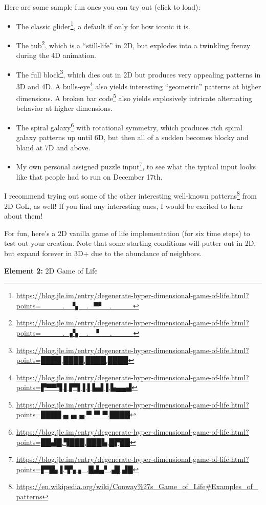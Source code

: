 \documentclass[]{article}
\renewcommand{\href}[2]{#2\footnote{\url{#1}}}
\begin{document}
Here are some sample fun ones you can try out (click to load):

\begin{itemize}
\tightlist
\item
  The
  \href{https://blog.jle.im/entry/degenerate-hyper-dimensional-game-of-life.html?points=____._▝▖_._▀▘_.____}{classic
  glider}, a default if only for how iconic it is.
\item
  The
  \href{https://blog.jle.im/entry/degenerate-hyper-dimensional-game-of-life.html?points=____._▞▖_._▝__.____}{tub},
  which is a ``still-life'' in 2D, but explodes into a twinkling frenzy during
  the 4D animation.
\item
  The
  \href{https://blog.jle.im/entry/degenerate-hyper-dimensional-game-of-life.html?points=████.████.████.████}{full
  block}, which dies out in 2D but produces very appealing patterns in 3D and
  4D. A
  \href{https://blog.jle.im/entry/degenerate-hyper-dimensional-game-of-life.html?points=▛▀▀▜.▌▛▜▐.▌▙▟▐.▙▄▄▟}{bulls-eye}
  also yields interesting ``geometric'' patterns at higher dimensions. A
  \href{https://blog.jle.im/entry/degenerate-hyper-dimensional-game-of-life.html?points=████.▄▗▖▄.▀▝▘▀.████}{broken
  bar code} also yields explosively intricate alternating behavior at higher
  dimensions.
\item
  The
  \href{https://blog.jle.im/entry/degenerate-hyper-dimensional-game-of-life.html?points=██▟█.▜███.███▙.█▛██}{spiral
  galaxy} with rotational symmetry, which produces rich spiral galaxy patterns
  up until 6D, but then all of a sudden becomes blocky and bland at 7D and
  above.
\item
  My
  \href{https://blog.jle.im/entry/degenerate-hyper-dimensional-game-of-life.html?points=▛▜▙▐.▜▚▗_.█▟▄▘.▟▌▟█}{own
  personal assigned puzzle input}, to see what the typical input looks like that
  people had to run on December 17th.
\end{itemize}

I recommend trying out some of the
\href{https://en.wikipedia.org/wiki/Conway\%27s_Game_of_Life\#Examples_of_patterns}{other
interesting well-known patterns} from 2D GoL, as well! If you find any
interesting ones, I would be excited to hear about them!

For fun, here's a 2D vanilla game of life implementation (for six time steps) to
test out your creation. Note that some starting conditions will putter out in
2D, but expand forever in 3D+ due to the abundance of neighbors.

\leavevmode\hypertarget{gol2D}{}%
\textbf{Element 2:} 2D Game of Life
\end{document}
